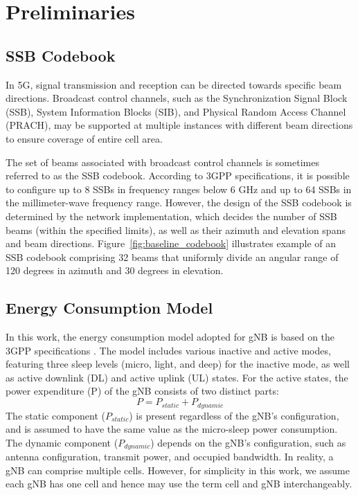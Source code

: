\section{Preliminaries}
\label{sec:prelim}
\subsection{SSB Codebook} \label{sec: SSB prelim}
In 5G, signal transmission and reception can be directed towards specific beam directions. Broadcast control channels, such as the Synchronization Signal Block (SSB), System Information Blocks (SIB), and Physical Random Access Channel (PRACH), may be supported at multiple instances with different beam directions to ensure coverage of entire cell area.

The set of beams associated with broadcast control channels is sometimes referred to as the SSB codebook. According to 3GPP specifications, it is possible to configure up to 8 SSBs in frequency ranges below 6 GHz and up to 64 SSBs in the millimeter-wave frequency range. However, the design of the SSB codebook is determined by the network implementation, which decides the number of SSB beams (within the specified limits), as well as their azimuth and elevation spans and beam directions.
Figure~\ref{fig:baseline_codebook} illustrates example of an SSB codebook comprising 32 beams that uniformly divide an angular range of 120 degrees in azimuth and 30 degrees in elevation.
\vspace{-10pt}
\subsection{Energy Consumption Model}
In this work, the energy consumption model adopted for gNB is based on the 3GPP specifications \cite{3gpp.38.864}. The model includes various inactive and active modes, featuring three sleep levels (micro, light, and deep) for the inactive mode, as well as active downlink (DL) and active uplink (UL) states. For the active states, the power expenditure (P) of the gNB consists of two distinct parts:
\smallskip
\begin{equation}\label{eq:power_model}
    P = P_{static} + P_{dynamic} 
\end{equation}
The static component ($P_{static}$) is present regardless of the gNB's configuration, and is assumed to have the same value as the micro-sleep power consumption. The dynamic component ($P_{dynamic}$) 
 depends on the gNB's configuration, such as antenna configuration, transmit power, and occupied bandwidth. In reality, a gNB can comprise multiple cells. However, for simplicity in this work, we assume each gNB has one cell and hence may use the term cell and gNB interchangeably. 
 
